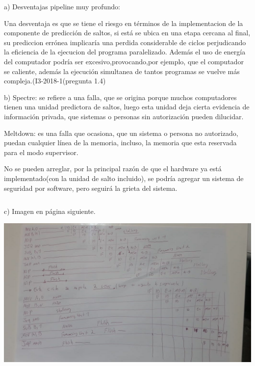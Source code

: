\documentclass[letter]{article}
\begin{document}
	
	
	
	
	
	
	
	
	
	
	
	
	
	\begin{pregunta}{4}
	$$ $$
	a) Desventajas pipeline muy profundo:
	
	Una desventaja es  que se tiene el riesgo en términos de la implementacion de la componente de predicción de saltos,  si está se ubica en una etapa cercana al final, su prediccion errónea implicaría una perdida considerable de ciclos perjudicando la eficiencia de la ejecucion del programa paralelizado. Además el uso de energía del computador podría ser excesivo,provocando,por ejemplo, que el computador se caliente, además la ejecución simultanea de tantos programas se vuelve más compleja.(I3-2018-1(pregunta 1.4)

	$$ $$
	b)	Spectre: se refiere a una falla, que se origina porque muchos computadores tienen una unidad predictora de saltos, luego esta unidad deja cierta evidencia de información privada, que sistemas o personas sin autorización pueden dilucidar.
	
	Meltdown: es una falla que ocasiona, que un sistema o persona no autorizado, puedan cualquier línea de la memoria, incluso, la memoria que esta reservada para el modo supervisor.
	
	No se pueden arreglar, por la principal razón de que el hardware ya está implementado(con la unidad de salto incluido), se podría agregar un sistema de seguridad por software, pero seguirá la grieta del sistema.
	
   
	$$ $$
	
	c) Imagen en página siguiente.

	{\includegraphics[width=17cm]{p4.jpeg}}
	\end{pregunta}
\end{document}
